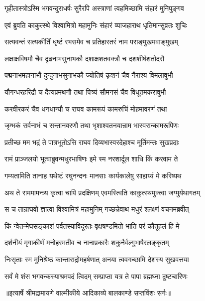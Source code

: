 \twolineshloka
{गृहीतास्त्रोऽस्मि भगवन्दुराधर्षः सुरैरपि}
{अस्त्राणां त्वहमिच्छामि संहारं मुनिपुङ्गव} %

\twolineshloka
{एवं ब्रुवति काकुत्स्थे विश्वामित्रो महामुनिः}
{संहारं व्याजहाराथ धृतिमान्सुव्रतः शुचिः} %

\twolineshloka
{सत्यवन्तं सत्यकीर्तिं धृष्टं रभसमेव च}
{प्रतिहारतरं नाम पराङ्मुखमवाङ्मुखम्} %

\twolineshloka
{लक्षाक्षविषमौ चैव दृढनाभसुनाभकौ}
{दशाक्षशतवक्त्रौ च दशशीर्षशतोदरौ} %

\twolineshloka
{पद्मनाभमहानाभौ दुन्दुनाभसुनाभकौ}
{ज्योतिषं कृशनं चैव नैराश्य विमलावुभौ} %

\twolineshloka
{यौगन्धरहरिद्रौ च दैत्यप्रमथनौ तथा}
{पित्र्यं सौमनसं चैव विधूतमकरावुभौ} %

\twolineshloka
{करवीरकरं चैव धनधान्यौ च राघव}
{कामरूपं कामरुचिं मोहमावरणं तथा} %

\twolineshloka
{जृम्भकं सर्वनाभं च सन्तानवरणौ तथा}
{भृशाश्वतनयान्राम भास्वरान्कामरूपिणः} %

\twolineshloka
{प्रतीच्छ मम भद्रं ते पात्रभूतोऽसि राघव}
{दिव्यभास्वरदेहाश्च मूर्तिमन्तः सुखप्रदाः} %

\twolineshloka
{रामं प्राञ्जलयो भूत्वाब्रुवन्मधुरभाषिणः}
{इमे स्म नरशार्दूल शाधि किं करवाम ते} %

\twolineshloka
{गम्यतामिति तानाह यथेष्टं रघुनन्दनः}
{मानसाः कार्यकालेषु साहाय्यं मे करिष्यथ} %

\twolineshloka
{अथ ते राममामन्त्र्य कृत्वा चापि प्रदक्षिणम्}
{एवमस्त्विति काकुत्स्थमुक्त्वा जग्मुर्यथागतम्} %

\twolineshloka
{स च तान्राघवो ज्ञात्वा विश्वामित्रं महामुनिम्}
{गच्छन्नेवाथ मधुरं श्लक्ष्णं वचनमब्रवीत्} %

\twolineshloka
{किं न्वेतन्मेघसङ्काशं पर्वतस्याविदूरतः}
{वृक्षषण्डमितो भाति परं कौतूहलं हि मे} %

\twolineshloka
{दर्शनीयं मृगाकीर्णं मनोहरमतीव च}
{नानाप्रकारैः शकुनैर्वल्गुभाषैरलङ्कृतम्} %

\twolineshloka
{निःसृताः स्म मुनिश्रेष्ठ कान्ताराद्रोमहर्षणात्}
{अनया त्ववगच्छामि देशस्य सुखवत्तया} %

\twolineshloka
{सर्वं मे शंस भगवन्कस्याश्रमपदं त्विदम्}
{सम्प्राप्ता यत्र ते पापा ब्रह्मघ्ना दुष्टचारिणः} %


{॥इत्यार्षे श्रीमद्रामायणे वाल्मीकीये आदिकाव्ये बालकाण्डे सप्तविंशः सर्गः॥}

